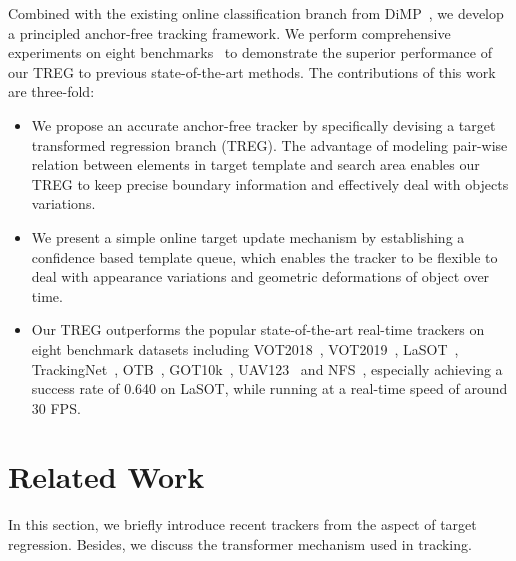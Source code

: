 \documentclass[10pt,twocolumn,letterpaper]{article}
\begin{document}
Combined with the existing online classification branch from DiMP~\cite{dimp}, we develop a principled anchor-free tracking framework. We perform comprehensive experiments on eight benchmarks~\cite{vot2018,vot2019,got10k,otb,trackingnet,lasot,uav123,nfs} to demonstrate the superior performance of our TREG to previous state-of-the-art methods. The contributions of this work are three-fold:
\begin{itemize}
\item We propose an accurate anchor-free tracker by specifically devising a target transformed regression branch (TREG). The advantage of modeling pair-wise relation between elements in target template and search area enables our TREG to keep precise boundary information and effectively deal with objects variations.
\item We present a simple online target update mechanism by establishing a confidence based template queue, which enables the tracker to be flexible to deal with appearance variations and geometric deformations of object over time. 
\item Our TREG outperforms the popular state-of-the-art real-time trackers on eight benchmark datasets including VOT2018~\cite{vot2018}, VOT2019~\cite{vot2019}, LaSOT~\cite{lasot}, TrackingNet~\cite{trackingnet}, OTB~\cite{otb}, GOT10k~\cite{got10k}, UAV123~\cite{uav123} and NFS~\cite{nfs}, especially achieving a success rate of 0.640 on LaSOT, while running at a real-time speed of around 30 FPS.
\end{itemize} 









\section{Related Work}
In this section, we briefly introduce recent trackers from the aspect of target regression. Besides, we discuss the transformer mechanism used in tracking.
\end{document}
